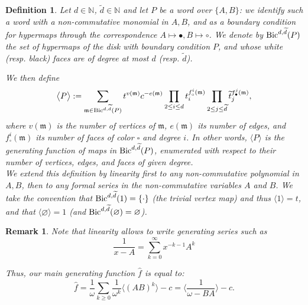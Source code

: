 \documentclass{scrartcl}
\newcommand\brak[1]{\big \langle #1 \big\rangle}
\newcommand{\N}{\mathbb{N}}
\newcommand\wh[1]{\widehat{#1}}
\newtheorem{defn}{Definition}[section]
\newtheorem{rem}{Remark}[section]
\begin{document}
\begin{defn}
Let $d\in \N$, $\widetilde{d}\in \N$ and let $P$ be a word over $\{A,B\}$: we identify such a word with a non-commutative monomial in $A,B$, and as a boundary condition for hypermaps through the correspondence $A \mapsto \bullet, B \mapsto \circ$. We denote by $\textnormal{Bic}^{d,\widetilde{d}}(P)$ the set of hypermaps of the disk with boundary condition $P$, and whose white (resp. black) faces are of degree at most $d$ (resp. $\widetilde{d}$).

We then define
\[
\brak{P} :=\sum_{\mathfrak{m} \in\textnormal{Bic}^{d,\widetilde{d}}(P)} t^{v(\mathfrak{m})}c^{-e(\mathfrak{m})}\prod_{2\leq i\leq d}t_i^{f_\circ^i(\mathfrak{m})}\prod_{2\leq j\leq \widetilde{d}}\widetilde{t}_j^{f_\bullet^j(\mathfrak{m})},
\]
where $v(\mathfrak{m})$ is the number of vertices of $\mathfrak{m}$, $e(\mathfrak{m})$ its number of edges, and $f_\square^i(\mathfrak{m})$ its number of faces of color $\square$ and degree $i$. In other words, $\brak{P}$ is the generating function of maps in $\textnormal{Bic}^{d,\widetilde{d}}(P)$, enumerated with respect to their number of vertices, edges, and faces of given degree.
\\
We extend this definition by linearity first to any non-commutative polynomial in $A,B$, then to any formal series in the non-commutative variables $A$ and $B$. We take the convention that $\textnormal{Bic}^{d,\widetilde{d}}(1)=\{ \cdot\}$ (the trivial vertex map) and thus $\brak{1}=t$, and that $\brak{\varnothing}=1$ (and $\textnormal{Bic}^{d,\widetilde{d}}(\varnothing)=\varnothing$).
\label{def:traces-as-map-amplitudes}
\end{defn}

\begin{rem}
    Note that linearity allows to write generating series such as  $$ \frac{1}{x-A} = \sum_{k=0}^\infty x^{-k-1} A^k $$

Thus, our main generating function $\wh{f}$ is equal to:
\[
\wh{f}=\frac{1}{\omega}\sum_{k\geq 0}\frac{1}{\omega^k}\brak{(AB)^k}-c=\brak{\frac{1}{\omega -BA}} -c.
\]
\end{rem}
\end{document}
